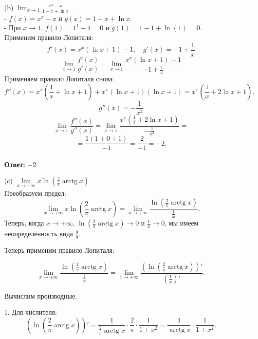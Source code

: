 \documentclass[a4paper]{article}
\newcommand{\lm}[1]{\underset{#1}{\lim}}
\begin{document}
\begin{enumerate}
\begin{enumerate}
        \item[(b)]$\lim _{x \rightarrow 1} \frac{x^{x}-x}{1-x+\ln x}$\\
        - $f(x) = x^x - x$ и $g(x) = 1 - x + \ln x$.\\
        - При $x \to 1$, $f(1) = 1^1 - 1 = 0$ и $g(1) = 1 - 1 + \ln(1) = 0$.\\
        Применим правило Лопиталя:
        $$
        f'(x) = x^x(\ln x + 1) - 1, \quad g'(x) = -1 + \frac{1}{x}
        $$
        $$
        \lim_{x \to 1} \frac{f'(x)}{g'(x)} = \lim_{x \to 1} \frac{x^x(\ln x + 1) - 1}{-1 + \frac{1}{x}}
        $$
        Применяем правило Лопиталя снова:
        $$
        f''(x) = x^x \left( \frac{1}{x} + \ln x + 1 \right) + x^x(\ln x + 1)(\ln x + 1) = x^x \left( \frac{1}{x} + 2\ln x + 1 \right).
        $$
        $$
        g''(x) = -\frac{1}{x^2}
        $$
        $$
        \lim_{x \to 1} \frac{f''(x)}{g''(x)} = \lim_{x \to 1} \frac{x^x \left( \frac{1}{x} + 2\ln x + 1 \right)}{-\frac{1}{x^2}}=
        $$
        $$
        = \frac{1 \left( 1 + 0 + 1 \right)}{-1} = \frac{2}{-1} = -2.
        $$
        \\\textbf{Ответ: }$-2$\\
        
        \item[(c)]$\lm{x \rightarrow+\infty} x \ln \left(\frac{2}{\pi} \operatorname{arctg} x\right)$\\
        Преобразуем предел: 
        $$
        \lim_{x \rightarrow +\infty} x \ln \left(\frac{2}{\pi} \operatorname{arctg} x\right) = \lim_{x \rightarrow +\infty} \frac{\ln \left(\frac{2}{\pi} \operatorname{arctg} x\right)}{\frac{1}{x}}.
        $$
        Теперь, когда $x \rightarrow +\infty$, $\ln \left(\frac{2}{\pi} \operatorname{arctg} x\right) \rightarrow 0$ и $\frac{1}{x} \rightarrow 0$, мы имеем неопределенность вида $\frac{0}{0}$.
        
        Теперь применим правило Лопиталя:

        $$
        \lim_{x \rightarrow +\infty} \frac{\ln \left(\frac{2}{\pi} \operatorname{arctg} x\right)}{\frac{1}{x}} = \lim_{x \rightarrow +\infty} \frac{\left(\ln \left(\frac{2}{\pi} \operatorname{arctg} x\right)\right)'}{\left(\frac{1}{x}\right)'}.
        $$
        
        Вычислим производные:

        1. Для числителя:
        $$
        \left(\ln \left(\frac{2}{\pi} \operatorname{arctg} x\right)\right)' = \frac{1}{\frac{2}{\pi} \operatorname{arctg} x} \cdot \frac{2}{\pi} \cdot \frac{1}{1+x^2} = \frac{1}{\operatorname{arctg} x} \cdot \frac{1}{1+x^2}.
        $$


\end{enumerate}
\end{enumerate}
\end{document}

